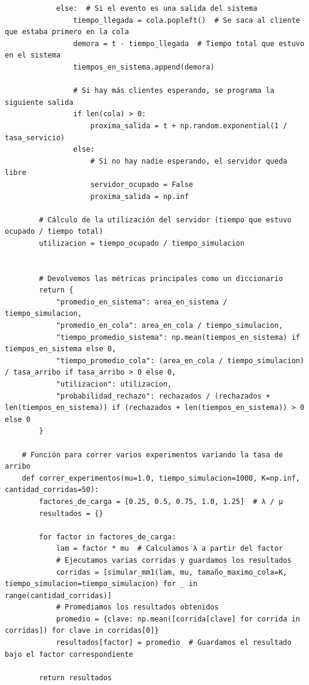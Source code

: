 \documentclass[12pt]{article}
\begin{document}
\begin{verbatim}
            else:  # Si el evento es una salida del sistema
                tiempo_llegada = cola.popleft()  # Se saca al cliente que estaba primero en la cola
                demora = t - tiempo_llegada  # Tiempo total que estuvo en el sistema
                tiempos_en_sistema.append(demora)
    
                # Si hay más clientes esperando, se programa la siguiente salida
                if len(cola) > 0:
                    proxima_salida = t + np.random.exponential(1 / tasa_servicio)
                else:
                    # Si no hay nadie esperando, el servidor queda libre
                    servidor_ocupado = False
                    proxima_salida = np.inf
    
        # Cálculo de la utilización del servidor (tiempo que estuvo ocupado / tiempo total)
        utilizacion = tiempo_ocupado / tiempo_simulacion
    
    
        # Devolvemos las métricas principales como un diccionario
        return {
            "promedio_en_sistema": area_en_sistema / tiempo_simulacion,
            "promedio_en_cola": area_en_cola / tiempo_simulacion,
            "tiempo_promedio_sistema": np.mean(tiempos_en_sistema) if tiempos_en_sistema else 0,
            "tiempo_promedio_cola": (area_en_cola / tiempo_simulacion) / tasa_arribo if tasa_arribo > 0 else 0,
            "utilizacion": utilizacion,
            "probabilidad_rechazo": rechazados / (rechazados + len(tiempos_en_sistema)) if (rechazados + len(tiempos_en_sistema)) > 0 else 0
        }
    
    # Función para correr varios experimentos variando la tasa de arribo
    def correr_experimentos(mu=1.0, tiempo_simulacion=1000, K=np.inf, cantidad_corridas=50):
        factores_de_carga = [0.25, 0.5, 0.75, 1.0, 1.25]  # λ / μ
        resultados = {}
    
        for factor in factores_de_carga:
            lam = factor * mu  # Calculamos λ a partir del factor
            # Ejecutamos varias corridas y guardamos los resultados
            corridas = [simular_mm1(lam, mu, tamaño_maximo_cola=K, tiempo_simulacion=tiempo_simulacion) for _ in range(cantidad_corridas)]
            # Promediamos los resultados obtenidos
            promedio = {clave: np.mean([corrida[clave] for corrida in corridas]) for clave in corridas[0]}
            resultados[factor] = promedio  # Guardamos el resultado bajo el factor correspondiente
    
        return resultados
    

\end{verbatim}
\end{document}
